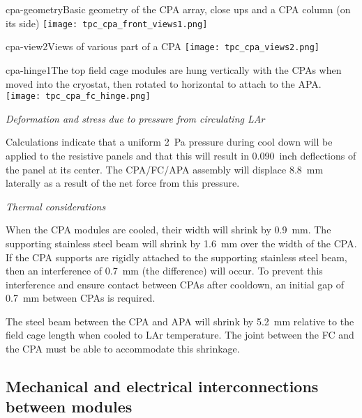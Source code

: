 \begin{cdrfigure}{cpa-geometry}{Basic geometry of the CPA array, close ups and a CPA column (on its side)} 
\texttt{[image: tpc\_cpa\_front\_views1.png]}
\end{cdrfigure}

\begin{cdrfigure}{cpa-view2}{Views of various part of a CPA} 
\texttt{[image: tpc\_cpa\_views2.png]}
\end{cdrfigure}

\begin{cdrfigure}{cpa-hinge1}{The top field cage modules are hung vertically with the CPAs when moved into the cryostat, then rotated to horizontal to attach to the APA.} 
\texttt{[image: tpc\_cpa\_fc\_hinge.png]}
\end{cdrfigure}


{\it Deformation and stress due to pressure from circulating LAr}

Calculations %
indicate that a uniform 2~Pa pressure during cool down will be
  applied to the resistive panels  and that this will result in 0.090~inch deflections of the panel at its center.  The CPA/FC/APA assembly will displace 8.8~mm laterally as a result of the net force from this pressure.  

{\it Thermal considerations}

When the CPA modules are cooled, their width will shrink by 0.9~mm.  The supporting stainless steel beam will shrink by 1.6~mm over the width of the CPA.  If the CPA supports are rigidly attached to the supporting stainless steel beam, then an interference of 0.7~mm (the difference) will occur.  To prevent this interference and ensure contact between CPAs after cooldown, an initial gap of 0.7~mm between CPAs is required.  

The steel beam between the CPA and APA will shrink by 5.2~mm relative to the field cage length when cooled to LAr temperature.  The joint between the FC and the CPA must be able to accommodate this shrinkage.



\subsection{Mechanical and electrical interconnections between modules}

